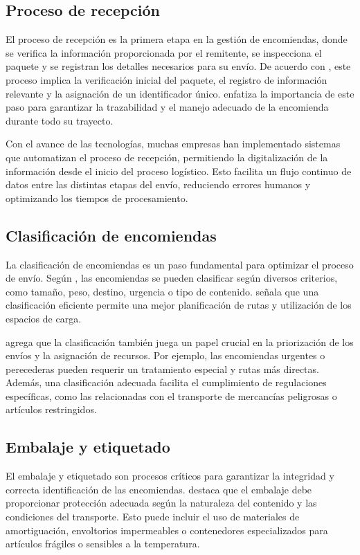 	\subsection{Proceso de recepción}
		El proceso de recepción es la primera etapa en la gestión de encomiendas, donde se verifica la información proporcionada por el remitente, se inspecciona el paquete y se registran los detalles necesarios para su envío. De acuerdo con \textcite{garcía2016gestión}, este proceso implica la verificación inicial del paquete, el registro de información relevante y la asignación de un identificador único. \textcite{escudero2019logistica} enfatiza la importancia de este paso para garantizar la trazabilidad y el manejo adecuado de la encomienda durante todo su trayecto.
		
		Con el avance de las tecnologías, muchas empresas han implementado sistemas que automatizan el proceso de recepción, permitiendo la digitalización de la información desde el inicio del proceso logístico. Esto facilita un flujo continuo de datos entre las distintas etapas del envío, reduciendo errores humanos y optimizando los tiempos de procesamiento.
	\subsection{Clasificación de encomiendas}
		La clasificación de encomiendas es un paso fundamental para optimizar el proceso de envío. Según \textcite{i2001manual}, las encomiendas se pueden clasificar según diversos criterios, como tamaño, peso, destino, urgencia o tipo de contenido. \textcite{tejero2015transporte} señala que una clasificación eficiente permite una mejor planificación de rutas y utilización de los espacios de carga.
		
		\textcite{escudero2019logistica} agrega que la clasificación también juega un papel crucial en la priorización de los envíos y la asignación de recursos. Por ejemplo, las encomiendas urgentes o perecederas pueden requerir un tratamiento especial y rutas más directas. Además, una clasificación adecuada facilita el cumplimiento de regulaciones específicas, como las relacionadas con el transporte de mercancías peligrosas o artículos restringidos.
	\subsection{Embalaje y etiquetado}
		El embalaje y etiquetado son procesos críticos para garantizar la integridad y correcta identificación de las encomiendas. \textcite{ramírez2015logística} destaca que el embalaje debe proporcionar protección adecuada según la naturaleza del contenido y las condiciones del transporte. Esto puede incluir el uso de materiales de amortiguación, envoltorios impermeables o contenedores especializados para artículos frágiles o sensibles a la temperatura.
		

